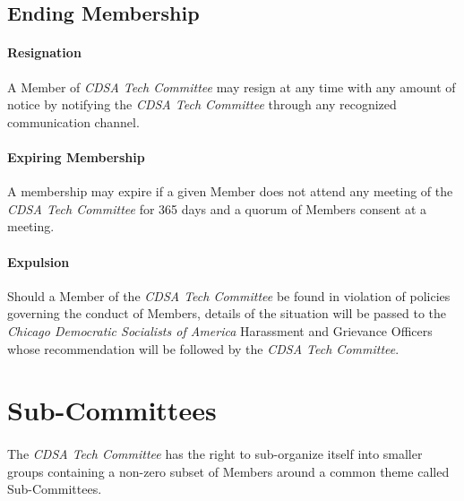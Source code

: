 \documentclass[12pt,letter,twocolumn,oneside,draft]{article}
\newcommand{\cname}{\emph{CDSA Tech Committee}}
\newcommand{\cdsa}{\emph{Chicago Democratic Socialists of America}}
\begin{document}
\subsection{Ending Membership}

\paragraph{Resignation}
A Member of \cname{} may resign at any time with any amount of notice by
notifying the \cname{} through any recognized communication channel.

\paragraph{Expiring Membership}
A membership may expire if a given Member does not attend any meeting of the
\cname{} for 365 days and a quorum of Members consent at a meeting.

\paragraph{Expulsion}
Should a Member of the \cname{} be found in violation of policies governing the
conduct of Members, details of the situation will be passed to the \cdsa{}
Harassment and Grievance Officers whose recommendation will be followed by the
\cname{}.


\section{Sub-Committees}

\paragraph{}
The \cname{} has the right to sub-organize itself into smaller groups
containing a non-zero subset of Members around a common theme called
Sub-Committees.
\end{document}
